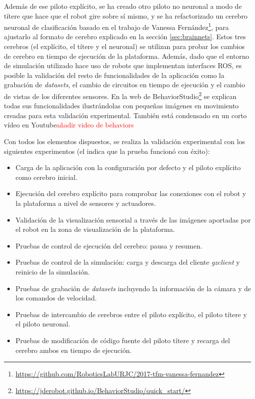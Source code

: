 Además de ese piloto explícito, se ha creado otro piloto no neuronal a modo de títere que hace que el robot gire sobre sí mismo, y se ha refactorizado un cerebro neuronal de clasificación basado en el trabajo de Vanessa Fernández\footnote{\url{https://github.com/RoboticsLabURJC/2017-tfm-vanessa-fernandez}}, para ajustarlo al formato de cerebro explicado en la sección \ref{sec:brainnets}. Estos tres cerebros (el explícito, el títere y el neuronal) se utilizan para probar los cambios de cerebro en tiempo de ejecución de la plataforma. Además, dado que el entorno de simulación utilizado hace uso de robots que implementan interfaces ROS, es posible la validación del resto de funcionalidades de la aplicación como la grabación de \textit{datasets}, el cambio de circuitos en tiempo de ejecución y el cambio de vistas de los diferentes sensores. En la web de BehaviorStudio\footnote{\url{https://jderobot.github.io/BehaviorStudio/quick_start/}} se explican todas sus funcionalidades ilustrándolas con pequeñas imágenes en movimiento creadas para esta validación experimental. También está condensado en un corto vídeo en Youtube\textcolor{red}{añadir video de behaviors}

Con todos los elementos dispuestos, se realiza la validación experimental con los siguientes experimentos (el \checkmark indica que la prueba funcionó con éxito):

\begin{itemize}
    \item Carga de la aplicación con la configuración por defecto y el piloto explícito como cerebro inicial. \checkmark
    \item Ejecución del cerebro explícito para comprobar las conexiones con el robot y la plataforma a nivel de sensores y actuadores. \checkmark
    \item Validación de la visualización sensorial a través de las imágenes aportadas por el robot en la zona de visualización de la plataforma. \checkmark
    \item Pruebas de control de ejecución del cerebro: pausa y resumen. \checkmark
    \item Pruebas de control de la simulación: carga y descarga del cliente \textit{gzclient} y reinicio de la simulación. \checkmark
    \item Pruebas de grabación de \textit{datasets} incluyendo la información de la cámara y de los comandos de velocidad. \checkmark
    \item Pruebas de intercambio de cerebros entre el piloto explícito, el piloto títere y el piloto neuronal. \checkmark
    \item Pruebas de modificación de código fuente del piloto títere y recarga del cerebro ambos en tiempo de ejecución. \checkmark
\end{itemize}

